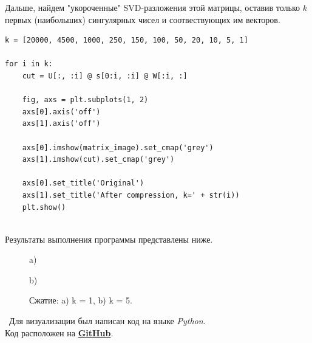 \documentclass[a5paper, 10pt]{article}
\theoremstyle{definition}
\theoremstyle{plain}
\theoremstyle{remark}
\begin{document}
Дальше, найдем "укороченные"  SVD-разложения этой матрицы, оставив только $k$ первых (наибольших) сингулярных чисел и соотвествующих им векторов. 
\begin{center}
\begin{lstlisting}[label=some-code,caption={Фрагмент кода для нахождения "укороченных"  SVD-разложений и отрисовки результата}]
k = [20000, 4500, 1000, 250, 150, 100, 50, 20, 10, 5, 1]

for i in k:
    cut = U[:, :i] @ s[0:i, :i] @ W[:i, :]

    fig, axs = plt.subplots(1, 2)
    axs[0].axis('off')
    axs[1].axis('off')

    axs[0].imshow(matrix_image).set_cmap('grey')
    axs[1].imshow(cut).set_cmap('grey')

    axs[0].set_title('Original')
    axs[1].set_title('After compression, k=' + str(i))
    plt.show()


\end{lstlisting}
\end{center}

Результаты выполнения программы представлены ниже.

\begin{figure}[h]
\begin{minipage}[h]{1\linewidth}
 a) \\
\end{minipage}
\begin{minipage}[h]{1\linewidth}
 b) \\
\end{minipage}
\caption{Сжатие: a) k = 1, b) k = 5.}
\end{figure}


\newpage
\,
\newpage
Для визуализации был написан код на языке \textit{Python}. \\
Код расположен на \href{https://github.com/a-nechaeva/practical_Linal/tree/main/lab4}{\textbf{GitHub}}.
\end{document}
